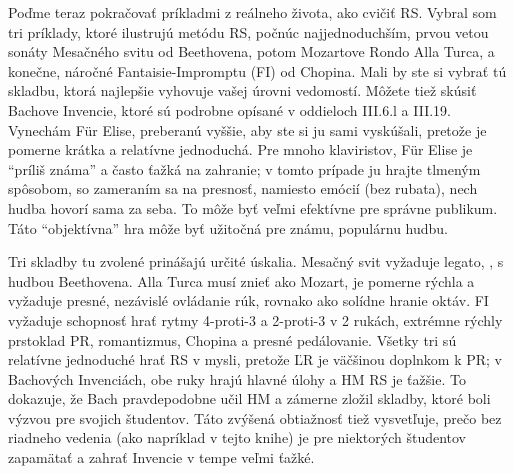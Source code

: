 Poďme teraz pokračovať príkladmi z reálneho života, ako cvičiť RS. Vybral som tri príklady, ktoré ilustrujú metódu RS, počnúc najjednoduchším, prvou vetou sonáty Mesačného svitu od Beethovena, potom Mozartove Rondo Alla Turca, a konečne, náročné Fantaisie-Impromptu (FI) od Chopina. Mali by ste si vybrať tú skladbu, ktorá najlepšie vyhovuje vašej úrovni vedomostí. Môžete tiež skúsiť Bachove Invencie, ktoré sú podrobne opísané v oddieloch III.6.l a III.19. Vynechám Für Elise, preberanú vyššie, aby ste si ju sami vyskúšali, pretože je pomerne krátka a relatívne jednoduchá. Pre mnoho klaviristov, Für Elise je “príliš známa” a často ťažká na zahranie; v tomto prípade ju hrajte tlmeným spôsobom, so zameraním sa na presnosť, namiesto emócií (bez rubata), nech hudba hovorí sama za seba. To môže byť veľmi efektívne pre správne publikum. Táto “objektívna” hra môže byť užitočná pre známu, populárnu hudbu.

Tri skladby tu zvolené prinášajú určité úskalia. Mesačný svit vyžaduje legato, , s hudbou Beethovena. Alla Turca musí znieť ako Mozart, je pomerne rýchla a vyžaduje presné, nezávislé ovládanie rúk, rovnako ako solídne hranie oktáv. FI vyžaduje schopnosť hrať rytmy 4-proti-3 a 2-proti-3 v 2 rukách, extrémne rýchly prstoklad PR, romantizmus, Chopina a presné pedálovanie. Všetky tri sú relatívne jednoduché hrať RS v mysli, pretože ĽR je väčšinou doplnkom k PR; v Bachových Invenciách, obe ruky hrajú hlavné úlohy a HM RS je ťažšie. To dokazuje, že Bach pravdepodobne učil HM a zámerne zložil skladby, ktoré boli výzvou pre svojich študentov. Táto zvýšená obtiažnosť tiež vysvetľuje, prečo bez riadneho vedenia (ako napríklad v tejto knihe) je pre niektorých študentov zapamätať a zahrať Invencie v tempe veľmi ťažké.


